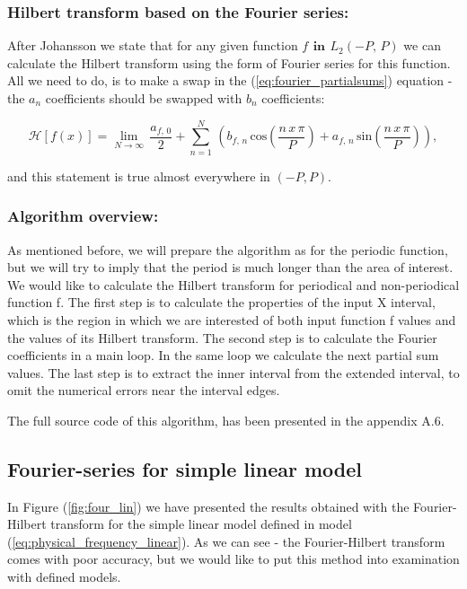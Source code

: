 \documentclass[12pt,twoside,a4paper]{article}
\numberwithin{equation}{subsection}
\numberwithin{figure}{subsection}
\begin{document}
\subsubsection*{Hilbert transform based on the Fourier series:}

After Johansson \cite{johansson_hilbert} we state that for any given function $f\,\ \textbf{in}\ \,{L_{2}}( - P, \,P)$ we can calculate the Hilbert transform using the form of Fourier series for this function. All we need to do, is to make a swap in the (\ref{eq:fourier_partialsums}) equation - the ${a_{n}}$ coefficients should be swapped with ${b_{n}}$ coefficients:

\begin{equation} \label{eq:fourier_hilbert}
	\mathcal{H}[f(x)] = \lim_{N\rightarrow \infty } \, \frac {{a_{f, \, 0}}}{2}  + \sum_{ n=1}^{N} \, 
		\left(
	  		  {b_{f, \,n}} \, \mathrm{cos}(\frac{n \, x\, \pi}{P}) 
			+ {a_{f, \,n}} \, \mathrm{sin}(\frac{n \, x\, \pi}{P})
		\right),
\end{equation}

and this statement is true almost everywhere in $(-P, P)$.

\subsubsection*{Algorithm overview:}

As mentioned before, we will prepare the algorithm as for the periodic function, but we will try to imply that the period is much longer than the area of interest. We would like to calculate the Hilbert transform for periodical and non-periodical function f. The first step is to calculate the properties of the input X interval, which is the region in which we are interested of both input function f values and the values of its Hilbert transform. The second step is to calculate the Fourier coefficients in a main loop. In the same loop we calculate the next partial sum values. The last step is to extract the inner interval from the extended interval, to omit the numerical errors near the interval edges.

The full source code of this algorithm, has been presented in the appendix A.6.

\subsection{Fourier-series for simple linear model} \label{chap:fourier_lin}

In Figure (\ref{fig:four_lin}) we have presented the results obtained with the Fourier-Hilbert transform for the simple linear model defined in model (\ref{eq:physical_frequency_linear}). As we can see - the Fourier-Hilbert transform comes with poor accuracy, but we would like to put this method into examination with defined models.
\end{document}
